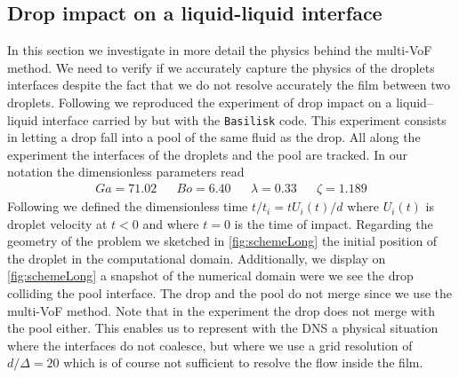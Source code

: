\subsection{Drop impact on a liquid-liquid interface}

In this section we investigate in more detail the physics behind the multi-VoF method. 
We need to verify if we accurately capture the physics of the droplets interfaces despite the fact that we do not resolve accurately the film between two droplets. 
Following \citet{balcazar2015multiple} we reproduced the experiment of drop impact on a liquid–liquid interface carried by \citet{mohamed2003drop} but with the \texttt{Basilisk} code. 
This experiment consists in letting a drop fall into a pool of the same fluid as the drop. 
All along the experiment the interfaces of the droplets and the pool are tracked. 
In our notation the dimensionless parameters read 
\begin{align*}
    Ga = 71.02 
    && Bo = 6.40
    && \lambda = 0.33
    && \zeta = 1.189
\end{align*}
Following \citet{mohamed2003drop} we defined the dimensionless time $t / t_i = t U_i(t) /d$ where $U_i(t)$ is droplet velocity at $t<0$ and where $t=0$ is the time of impact. 
Regarding the geometry of the problem we sketched in \ref{fig:schemeLong} the initial position of the droplet in the computational domain.
Additionally, we display on \ref{fig:schemeLong} a snapshot of the numerical domain were we see the drop colliding the pool interface.
The drop and the pool do not merge since we use the multi-VoF method. 
Note that in the experiment the drop does not merge with the pool either.
This enables us to represent with the DNS a physical situation where the interfaces do not coalesce, but where we use a grid resolution of $d/\Delta = 20$ which is of course not sufficient to resolve the flow inside the film. 
